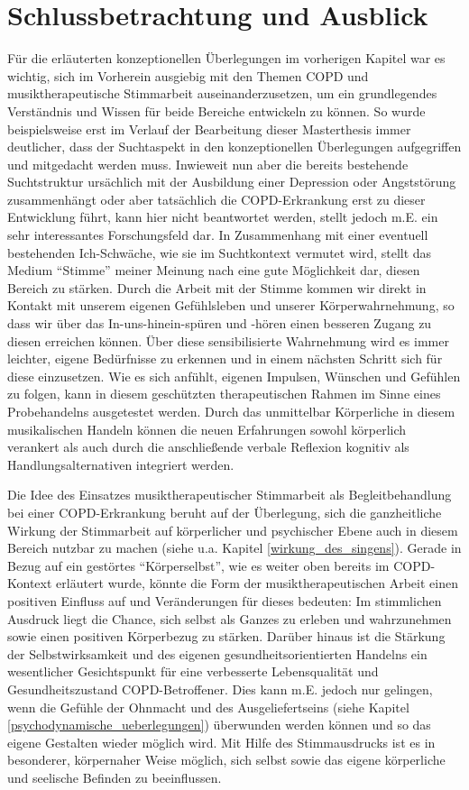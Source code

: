 \chapter{Schlussbetrachtung und Ausblick} %
Für die erläuterten konzeptionellen Überlegungen im vorherigen Kapitel war es wichtig, sich im Vorherein ausgiebig mit den Themen COPD und musiktherapeutische Stimmarbeit auseinanderzusetzen, um ein grundlegendes Verständnis und Wissen für beide Bereiche entwickeln zu können. So wurde beispielsweise erst im Verlauf der Bearbeitung dieser Masterthesis immer deutlicher, dass der Suchtaspekt in den konzeptionellen Überlegungen aufgegriffen und mitgedacht werden muss. Inwieweit nun aber die bereits bestehende Suchtstruktur ursächlich mit der Ausbildung einer Depression oder Angststörung zusammenhängt oder aber tatsächlich die COPD-Erkrankung erst zu dieser Entwicklung führt, kann hier nicht beantwortet werden, stellt jedoch m.E. ein sehr interessantes Forschungsfeld dar. In Zusammenhang mit einer eventuell bestehenden Ich-Schwäche, wie sie im Suchtkontext vermutet wird, stellt das Medium "`Stimme"' meiner Meinung nach eine gute Möglichkeit dar, diesen Bereich zu stärken. Durch die Arbeit mit der Stimme kommen wir direkt in Kontakt mit unserem eigenen Gefühlsleben und unserer Körperwahrnehmung, so dass wir über das In-uns-hinein-spüren und -hören einen besseren Zugang zu diesen erreichen können. Über diese sensibilisierte Wahrnehmung wird es immer leichter, eigene Bedürfnisse zu erkennen und in einem nächsten Schritt sich für diese einzusetzen. Wie es sich anfühlt, eigenen Impulsen, Wünschen und Gefühlen zu folgen, kann in diesem geschützten therapeutischen Rahmen im Sinne eines Probehandelns ausgetestet werden. Durch das unmittelbar Körperliche in diesem musikalischen Handeln können die neuen Erfahrungen sowohl körperlich verankert als auch durch die anschließende verbale Reflexion kognitiv als Handlungsalternativen integriert werden.

Die Idee des Einsatzes musiktherapeutischer Stimmarbeit als Begleitbehandlung bei einer COPD-Erkrankung beruht auf der Überlegung, sich die ganzheitliche Wirkung der Stimmarbeit auf körperlicher und psychischer Ebene auch in diesem Bereich nutzbar zu machen (siehe u.a. Kapitel \ref{wirkung_des_singens}). Gerade in Bezug auf ein gestörtes "`Körperselbst"', wie es weiter oben bereits im COPD-Kontext erläutert wurde, könnte die Form der musiktherapeutischen Arbeit einen positiven Einfluss auf und Veränderungen für dieses bedeuten: Im stimmlichen Ausdruck liegt die Chance, sich selbst als Ganzes zu erleben und wahrzunehmen sowie einen positiven Körperbezug zu stärken. Darüber hinaus ist die Stärkung der Selbstwirksamkeit und des eigenen gesundheitsorientierten Handelns ein wesentlicher Gesichtspunkt für eine verbesserte Lebensqualität und Gesundheitszustand COPD-Betroffener. Dies kann m.E. jedoch nur gelingen, wenn die Gefühle der Ohnmacht und des Ausgeliefertseins (siehe Kapitel \ref{psychodynamische_ueberlegungen}) überwunden werden können und so das eigene Gestalten wieder möglich wird. Mit Hilfe des Stimmausdrucks ist es in besonderer, körpernaher Weise möglich, sich selbst sowie das eigene körperliche und seelische Befinden zu beeinflussen. 

